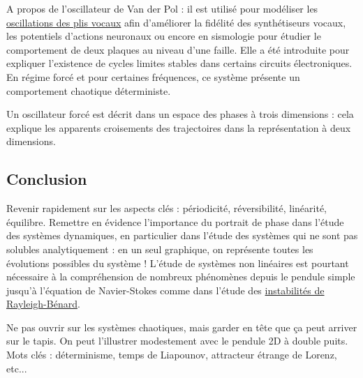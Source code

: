 \begin{remarque}
A propos de l'oscillateur de Van der Pol : il est utilisé pour modéliser les \href{https://asa.scitation.org/doi/abs/10.1121/1.4798467}{oscillations des plis vocaux} afin d'améliorer la fidélité des synthétiseurs vocaux, les potentiels d'actions neuronaux ou encore en sismologie pour étudier le comportement de deux plaques au niveau d'une faille.
Elle a été introduite pour expliquer l'existence de cycles limites stables dans certains circuits électroniques.
En régime forcé et pour certaines fréquences, ce système présente un comportement chaotique déterministe.

\noindent
Un oscillateur forcé est décrit dans un espace des phases à trois dimensions : cela explique les apparents croisements des trajectoires dans la représentation à deux dimensions.
\end{remarque}

\subsection*{Conclusion}

Revenir rapidement sur les aspects clés : périodicité, réversibilité, linéarité, équilibre.
Remettre en évidence l'importance du portrait de phase dans l'étude des systèmes dynamiques, en particulier dans l'étude des systèmes qui ne sont pas solubles analytiquement : en un seul graphique, on représente toutes les évolutions possibles du système !
L'étude de systèmes non linéaires est pourtant nécessaire à la compréhension de nombreux phénomènes depuis le pendule simple jusqu'à l'équation de Navier-Stokes comme dans l'étude des \href{https://fr.wikipedia.org/wiki/Instabilit\%C3\%A9_de_Rayleigh-B\%C3\%A9nard}{instabilités de Rayleigh-Bénard}.

Ne pas ouvrir sur les systèmes chaotiques, mais garder en tête que ça peut arriver sur le tapis.
On peut l'illustrer modestement avec le pendule 2D à double puits.
Mots clés : déterminisme, temps de Liapounov, attracteur étrange de Lorenz, etc... 

\newpage